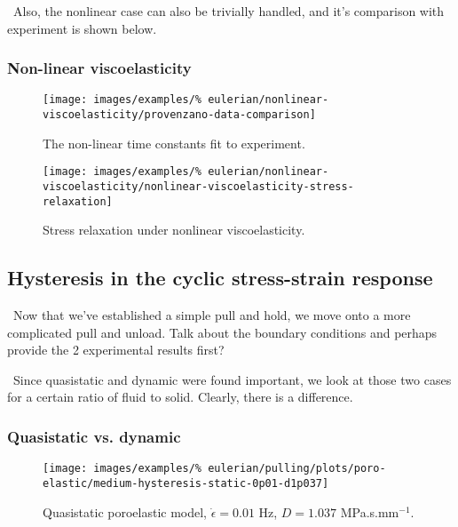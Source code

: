 \textbullet\ Also, the nonlinear case can also be trivially handled,
and it's comparison with experiment is shown below.

\subsubsection{Non-linear viscoelasticity}
\label{non-linear-viscoelasticity}

\begin{figure}[!hptb]
\centering
\texttt{[image: images/examples/\%
eulerian/nonlinear-viscoelasticity/provenzano-data-comparison]}
\caption{The non-linear time constants fit to experiment.} 
\label{provenzano-data-fit}
\end{figure}

\begin{figure}[!hptb]
\centering
\texttt{[image: images/examples/\%
eulerian/nonlinear-viscoelasticity/nonlinear-viscoelasticity-stress-relaxation]}
\caption{Stress relaxation under nonlinear viscoelasticity.}
\label{nonlinear-viscoelasticity-stress-relaxation}
\end{figure}

\clearpage

\subsection{Hysteresis in the cyclic stress-strain response}
\label{hysteresis}

\textbullet\ Now that we've established a simple pull and hold, we
move onto a more complicated pull and unload. Talk about the boundary
conditions and perhaps provide the 2 experimental results first?

\textbullet\ Since quasistatic and dynamic were found important, we
look at those two cases for a certain ratio of fluid to
solid. Clearly, there is a difference.

\subsubsection{Quasistatic vs. dynamic}
\label{quasistatic-vs-dynamic}

\begin{figure}[!hptb]
\centering
\texttt{[image: images/examples/\%
eulerian/pulling/plots/poro-elastic/medium-hysteresis-static-0p01-d1p037]}
\caption{Quasistatic poroelastic model, $\dot{\epsilon}=0.01$ Hz, $D=1.037$
  MPa.s.mm$^{-1}$.}
\label{medium-hysteresis-static-0p01-d1p037}
\end{figure}

